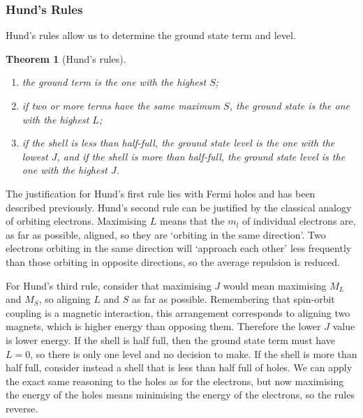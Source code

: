 \documentclass{article}
\theoremstyle{plain}\theoremheaderfont{\normalfont\itshape}\theorembodyfont{\rmfamily}\theoremseparator{.}\newtheorem*{rem}{Remark}\newtheorem*{ex}{Example}\newtheorem*{proof}{Proof}\newtheorem*{altp}{Alternative proof}
\theoremstyle{plain}\theoremheaderfont{\normalfont\bfseries}\theorembodyfont{\rmfamily}\theoremseparator{.}\newtheorem{thm}{Theorem}[section]\newtheorem{lem}[thm]{Lemma}\newtheorem{prop}[thm]{Proposition}\newtheorem*{cor}{Corollary}\newtheorem{defn}[thm]{Definition}\newtheorem{clm}[thm]{Claim}\newtheorem{clminproof}{Claim}
\theoremstyle{break}\theoremheaderfont{\normalfont\itshape}\theorembodyfont{\rmfamily}\theoremseparator{.\medskip}\newtheorem*{proofskip}{Proof}\newtheorem*{exs}{Examples}\newtheorem*{rems}{Remarks}
\theoremstyle{break}\theoremheaderfont{\normalfont\bfseries}\theorembodyfont{\rmfamily}\theoremseparator{.\medskip}\newtheorem{lemskip}[thm]{Lemma}\newtheorem{defnskip}[thm]{Definition}\newtheorem{propskip}[thm]{Proposition}\newtheorem{thmskip}[thm]{Theorem}
\numberwithin{equation}{section}
\begin{document}
    \subsubsection{Hund's Rules}
    Hund's rules allow us to determine the ground state term and level.
    \begin{thmskip}[Hund's rules]
        \begin{enumerate}
            \item the ground term is the one with the highest \(S\);
            \item if two or more terms have the same maximum \(S\), the ground state is the one with the highest \(L\);
            \item if the shell is less than half-full, the ground state level is the one with the lowest \(J\), and if the shell is more than half-full, the ground state level is the one with the highest \(J\).
        \end{enumerate}
    \end{thmskip}

    The justification for Hund's first rule lies with Fermi holes and has been described previously. Hund's second rule can be justified by the classical analogy of orbiting electrons. Maximising \(L\) means that the \(m_l\) of individual electrons are, as far as possible, aligned, so they are `orbiting in the same direction'. Two electrons orbiting in the same direction will `approach each other' less frequently than those orbiting in opposite directions, so the average repulsion is reduced.

    For Hund's third rule, consider that maximising \(J\) would mean maximising \(M_L\) and \(M_S\), so aligning \(L\) and \(S\) as far as possible. Remembering that spin-orbit coupling is a magnetic interaction, this arrangement corresponds to aligning two magnets, which is higher energy than opposing them. Therefore the lower \(J\) value is lower energy. If the shell is half full, then the ground state term must have \(L=0\), so there is only one level and no decision to make. If the shell is more than half full, consider instead a shell that is less than half full of holes. We can apply the exact same reasoning to the holes as for the electrons, but now maximising the energy of the holes means minimising the energy of the electrons, so the rules reverse.
\end{document}
